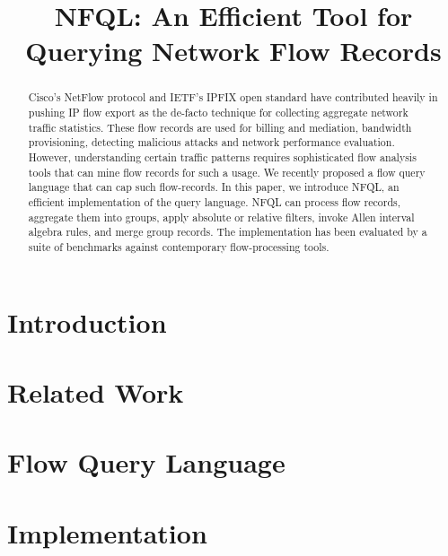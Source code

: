 \documentclass[conference]{IEEEtran}
\begin{document}
\title{NFQL: An Efficient Tool for Querying Network Flow Records}
\author{ }

\maketitle


\begin{abstract} Cisco's NetFlow protocol and IETF's IPFIX open standard have
  contributed heavily in pushing IP flow export as the de-facto technique for
  collecting aggregate network traffic statistics. These flow records are used
  for billing and mediation, bandwidth provisioning, detecting malicious
  attacks and network performance evaluation. However, understanding certain
  traffic patterns requires sophisticated flow analysis tools that can mine
  flow records for such a usage. We recently proposed a flow query language
  that can cap such flow-records. In this paper, we introduce \ac{NFQL}, an
  efficient implementation of the query language.  \ac{NFQL} can process flow
  records, aggregate them into groups, apply absolute or relative filters,
  invoke Allen interval algebra rules, and merge group records. The
  implementation has been evaluated by a suite of benchmarks against
  contemporary flow-processing tools.\end{abstract}



\section{Introduction}
\label{sec:introduction}
\section{Related Work}
\label{sec:relatedwork}
\section{Flow Query Language}
\label{sec:design}
\section{Implementation}\label{sec:implementation}

\end{document}
